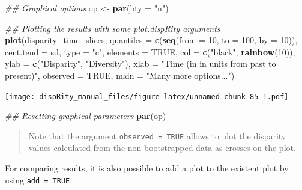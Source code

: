 \documentclass[
]{book}
\newenvironment{Shaded}{\begin{snugshade}}{\end{snugshade}}
\newcommand{\CommentTok}[1]{\textcolor[rgb]{0.56,0.35,0.01}{\textit{#1}}}
\newcommand{\DataTypeTok}[1]{\textcolor[rgb]{0.13,0.29,0.53}{#1}}
\newcommand{\DecValTok}[1]{\textcolor[rgb]{0.00,0.00,0.81}{#1}}
\newcommand{\KeywordTok}[1]{\textcolor[rgb]{0.13,0.29,0.53}{\textbf{#1}}}
\newcommand{\NormalTok}[1]{#1}
\newcommand{\OtherTok}[1]{\textcolor[rgb]{0.56,0.35,0.01}{#1}}
\newcommand{\StringTok}[1]{\textcolor[rgb]{0.31,0.60,0.02}{#1}}
\begin{document}
\begin{Shaded}
\begin{Highlighting}[]
\CommentTok{\#\# Graphical options}
\NormalTok{op \textless{}{-}}\StringTok{ }\KeywordTok{par}\NormalTok{(}\DataTypeTok{bty =} \StringTok{"n"}\NormalTok{)}

\CommentTok{\#\# Plotting the results with some plot.dispRity arguments}
\KeywordTok{plot}\NormalTok{(disparity\_time\_slices,}
    \DataTypeTok{quantiles =} \KeywordTok{c}\NormalTok{(}\KeywordTok{seq}\NormalTok{(}\DataTypeTok{from =} \DecValTok{10}\NormalTok{, }\DataTypeTok{to =} \DecValTok{100}\NormalTok{, }\DataTypeTok{by =} \DecValTok{10}\NormalTok{)),}
    \DataTypeTok{cent.tend =}\NormalTok{ sd, }\DataTypeTok{type =} \StringTok{"c"}\NormalTok{, }\DataTypeTok{elements =} \OtherTok{TRUE}\NormalTok{,}
    \DataTypeTok{col =} \KeywordTok{c}\NormalTok{(}\StringTok{"black"}\NormalTok{, }\KeywordTok{rainbow}\NormalTok{(}\DecValTok{10}\NormalTok{)),}
    \DataTypeTok{ylab =} \KeywordTok{c}\NormalTok{(}\StringTok{"Disparity"}\NormalTok{, }\StringTok{"Diversity"}\NormalTok{),}
    \DataTypeTok{xlab =} \StringTok{"Time (in in units from past to present)"}\NormalTok{,}
    \DataTypeTok{observed =} \OtherTok{TRUE}\NormalTok{,}
    \DataTypeTok{main =} \StringTok{"Many more options..."}\NormalTok{)}
\end{Highlighting}
\end{Shaded}

\texttt{[image: dispRity\_manual\_files/figure-latex/unnamed-chunk-85-1.pdf]}

\begin{Shaded}
\begin{Highlighting}[]
\CommentTok{\#\# Resetting graphical parameters}
\KeywordTok{par}\NormalTok{(op)}
\end{Highlighting}
\end{Shaded}

\begin{quote}
Note that the argument \texttt{observed\ =\ TRUE} allows to plot the disparity values calculated from the non-bootstrapped data as crosses on the plot.
\end{quote}

For comparing results, it is also possible to add a plot to the existent plot by using \texttt{add\ =\ TRUE}:
\end{document}

